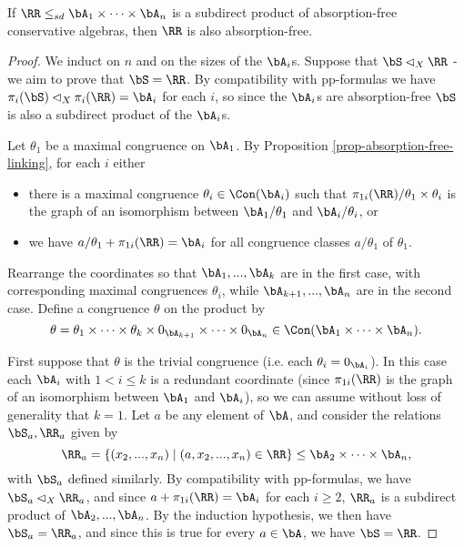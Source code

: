 \begin{thm}\label{thm-conservative-subdirect-absorption-free} If $\RR \le_{sd} \bA_1 \times \cdots \times \bA_n$ is a subdirect product of absorption-free conservative algebras, then $\RR$ is also absorption-free.
\end{thm}
\begin{proof} We induct on $n$ and on the sizes of the $\bA_i$s. Suppose that $\bS \lhd_X \RR$ - we aim to prove that $\bS = \RR$. By compatibility with pp-formulas we have $\pi_i(\bS) \lhd_X \pi_i(\RR) = \bA_i$ for each $i$, so since the $\bA_i$s are absorption-free $\bS$ is also a subdirect product of the $\bA_i$s.

Let $\theta_1$ be a maximal congruence on $\bA_1$. By Proposition \ref{prop-absorption-free-linking}, for each $i$ either
\begin{itemize}
\item there is a maximal congruence $\theta_i \in \Con(\bA_i)$ such that $\pi_{1i}(\RR)/\theta_1\times\theta_i$ is the graph of an isomorphism between $\bA_1/\theta_1$ and $\bA_i/\theta_i$, or
\item we have $a/\theta_1 + \pi_{1i}(\RR) = \bA_i$ for all congruence classes $a/\theta_1$ of $\theta_1$.
\end{itemize}
Rearrange the coordinates so that $\bA_1, ..., \bA_k$ are in the first case, with corresponding maximal congruences $\theta_i$, while $\bA_{k+1}, ..., \bA_n$ are in the second case. Define a congruence $\theta$ on the product by
\[
\theta = \theta_1 \times \cdots \times \theta_k \times 0_{\bA_{k+1}} \times \cdots \times 0_{\bA_n} \in \Con(\bA_1 \times \cdots \times \bA_n).
\]

First suppose that $\theta$ is the trivial congruence (i.e. each $\theta_i = 0_{\bA_i}$). In this case each $\bA_i$ with $1 < i \le k$ is a redundant coordinate (since $\pi_{1i}(\RR)$ is the graph of an isomorphism between $\bA_1$ and $\bA_i$), so we can assume without loss of generality that $k = 1$. Let $a$ be any element of $\bA$, and consider the relations $\bS_a, \RR_a$ given by
\[
\RR_a = \{(x_2, ..., x_n) \mid (a,x_2, ..., x_n) \in \RR\} \le \bA_2 \times \cdots \times \bA_n,
\]
with $\bS_a$ defined similarly. By compatibility with pp-formulas, we have $\bS_a \lhd_X \RR_a$, and since $a + \pi_{1i}(\RR) = \bA_i$ for each $i \ge 2$, $\RR_a$ is a subdirect product of $\bA_2, ..., \bA_n$. By the induction hypothesis, we then have $\bS_a = \RR_a$, and since this is true for every $a \in \bA$, we have $\bS = \RR$.


\end{proof}
